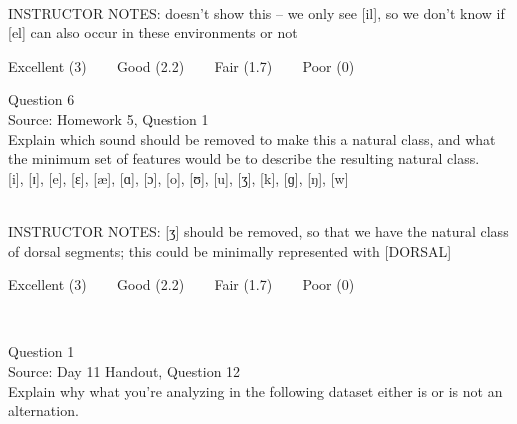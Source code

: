 \documentclass[12pt]{article}
\begin{document}
~\\
INSTRUCTOR NOTES: doesn't show this -- we only see [il], so we don't know if [el] can also occur in these environments or not


\vfill
Excellent (3) ~~~ Good (2.2) ~~~ Fair (1.7) ~~~ Poor (0)
\newpage

{\large Question 6}\\

Source: Homework 5, Question 1\\

Explain which sound should be removed to make this a natural class, and what the minimum set of features would be to describe the resulting natural class.\\

{[i]}, {[ɪ]}, {[e]}, {[ɛ]}, {[æ]}, {[ɑ]}, {[ɔ]}, {[o]}, {[ʊ]}, {[u]}, {[ʒ]}, {[k]}, {[ɡ]}, {[ŋ]}, {[w]}


~\\
INSTRUCTOR NOTES: [ʒ] should be removed, so that we have the natural class of dorsal segments; this could be minimally represented with [DORSAL]


\vfill
Excellent (3) ~~~ Good (2.2) ~~~ Fair (1.7) ~~~ Poor (0)
\newpage

\begin{center}
\textbf{{\color{red}{\HUGE END OF EXAM}}}\\

\end{center}
\newpage

\begin{center}
\textbf{{\color{blue}{\HUGE START OF EXAM\\}}}

\textbf{{\color{blue}{\HUGE Student ID: 4220\\}}}

\textbf{{\color{blue}{\HUGE 12:30 - 12:50 PM\\}}}

\end{center}
\newpage

{\large Question 1}\\

Source: Day 11 Handout, Question 12\\

Explain why what you’re analyzing in the following dataset either is or is not an alternation.\\
\end{document}
